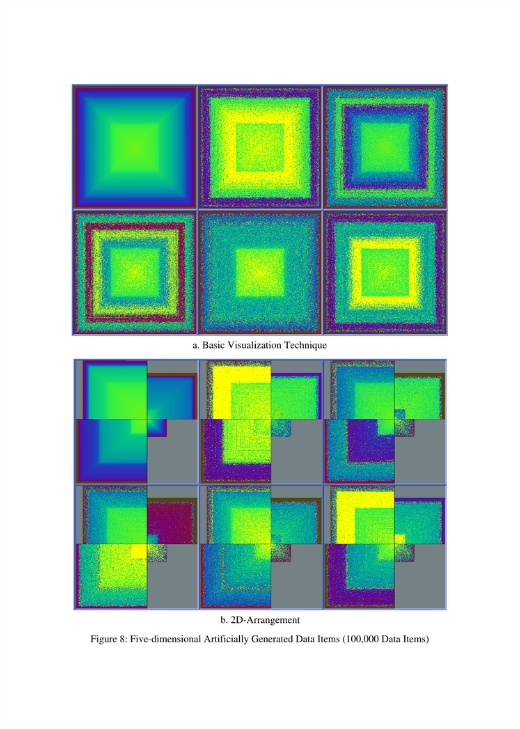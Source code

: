 \begin{itemize}
{    \includegraphics [width=\linewidth]{figures/pixel_keim_axes.pdf}
    \label{fig:pixel-axes}
}
\hfill
\parbox [h]{0.35\textwidth }{
}
\end{itemize}

